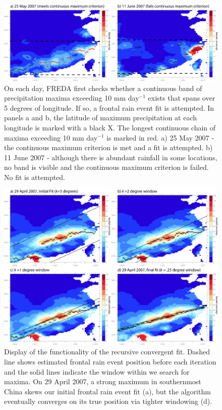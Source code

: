 \documentclass[singlecolumn,11pt]{pnas-new}
\begin{document}
\begin{figure}[htbp]
\centering
\noindent\includegraphics[width=39pc]{Figures/algo_1}
\caption{On each day, FREDA first checks whether a continuous band of precipitation maxima exceeding 10 mm day$^{-1}$ exists that spans over 5 degrees of longitude. If so, a frontal rain event fit is attempted. In panels a and b, the latitude of maximum precipitation at each longitude is marked with a black X. The longest continuous chain of maxima exceeding 10 mm day$^{-1}$ is marked in red. a) 25 May 2007 - the continuous maximum criterion is met and a fit is attempted.  b) 11 June 2007 - although there is abundant rainfall in some locations, no band is visible and the continuous maximum criterion is failed. No fit is attempted.}
\label{fig:algo_1}
\end{figure}

\begin{figure}[htbp]
\centering
\noindent\includegraphics[width=39pc]{Figures/algo_2}
\caption{Display of the functionality of the recursive convergent fit. Dashed line shows estimated frontal rain event position before each iteration and the solid lines indicate the window within we search for maxima. On 29 April 2007, a strong maximum in southernmost China skews our initial frontal rain event fit (a), but the algorithm eventually converges on its true position via tighter windowing (d).}
\label{fig:algo_2}
\end{figure}
\end{document}

